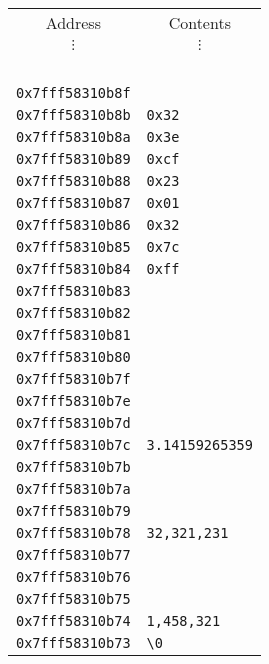 

\begin{tabular}{|l|l|}
\multicolumn{1}{c}{Address} & \multicolumn{1}{c}{Contents} \\
\multicolumn{1}{c}{$\vdots$} & \multicolumn{1}{c}{$\vdots$} \\
~ & ~  \\
\hline
\texttt{0x7fff58310b8f} & \texttt{~} \\
\hline
\texttt{0x7fff58310b8b} & \texttt{0x32} \\
\hline
\texttt{0x7fff58310b8a} & \texttt{0x3e} \\
\hline
\texttt{0x7fff58310b89} & \texttt{0xcf} \\
\hline
\texttt{0x7fff58310b88} & \texttt{0x23} \\
\hline
\texttt{0x7fff58310b87} & \texttt{0x01} \\
\hline
\texttt{0x7fff58310b86} & \texttt{0x32} \\
\hline
\texttt{0x7fff58310b85} & \texttt{0x7c} \\
\hline
\texttt{0x7fff58310b84} & \texttt{0xff} \\
\hline
\texttt{0x7fff58310b83} & \texttt{~} \\
\texttt{0x7fff58310b82} & \texttt{~} \\
\texttt{0x7fff58310b81} & \texttt{~} \\
\texttt{0x7fff58310b80} & \texttt{~} \\
\texttt{0x7fff58310b7f} & \texttt{~} \\
\texttt{0x7fff58310b7e} & \texttt{~} \\
\texttt{0x7fff58310b7d} & \texttt{~} \\
\texttt{0x7fff58310b7c} & \texttt{3.14159265359} \\
\hline
\texttt{0x7fff58310b7b} & \texttt{~} \\
\texttt{0x7fff58310b7a} & \texttt{~} \\
\texttt{0x7fff58310b79} & \texttt{~} \\
\texttt{0x7fff58310b78} & \texttt{32,321,231} \\
\hline
\texttt{0x7fff58310b77} & \texttt{~} \\
\texttt{0x7fff58310b76} & \texttt{~} \\
\texttt{0x7fff58310b75} & \texttt{~} \\
\texttt{0x7fff58310b74} & \texttt{1,458,321} \\
\hline
\texttt{0x7fff58310b73} & \texttt{\textbackslash 0} \\
\hline

\end{tabular}
